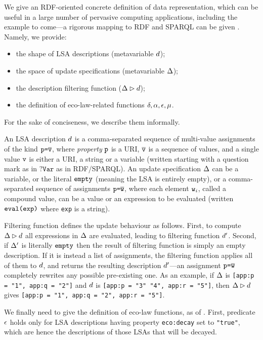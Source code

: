 \documentclass[12pt,a4paper,twoside,openright]{book}
\begin{document}
We give an RDF-oriented concrete definition of data representation, which can be useful in a large number of pervasive computing applications, including the example to come---a rigorous mapping to RDF and SPARQL can be given \cite{SemanticSapereIGI2012}.
%
Namely, we provide:
\begin{itemize}
 \item the shape of LSA descriptions (metavariable $d$);
 \item the space of update specifications (metavariable $\Delta$);
 \item the description filtering function ($\Delta\rhd d$);
 \item the definition of eco-law-related functions $\delta,\alpha,\epsilon,\mu$.
\end{itemize}
For the sake of conciseness, we describe them informally.

An LSA description $d$ is a comma-separated sequence of multi-value assignments of the kind $\texttt{p} \texttt{=} \overline{\texttt{v}}$, where \emph{property} $\texttt{p}$ is a URI, $\overline{\texttt{v}}$ is a sequence of values, and a single value $\texttt{v}$ is either a URI, a string or a variable (written starting with a question mark as in $\texttt{?Var}$ as in RDF/SPARQL).
%
An update specification $\Delta$ can be a variable, or the literal $\texttt{empty}$ (meaning the LSA is entirely empty), or a comma-separated sequence of assignments $\texttt{p}\texttt{=} \overline{\texttt{w}}$, where each element $\texttt{w}_i$, called a compound value, can be a value or an expression to be evaluated (written $\texttt{eval(exp)}$ where \texttt{exp} is a string).

Filtering function defines the update behaviour as follows.
%
First, to compute $\Delta\rhd d$ all expressions in $\Delta$ are evaluated, leading to filtering function $d'$.
%
Second, if $\Delta'$ is literally $\texttt{empty}{}$ then the result of filtering function is simply an empty description.
%
If it is instead a list of assignments, the filtering function applies all of them to $d$, and returns the resulting description $d'$---an assignment $\texttt{p}\texttt{=} \overline{\texttt{w}}$ completely rewrites any possible pre-existing one.
%
As an example, if $\Delta$ is \mbox{\texttt{[app:p = "1", app:q = "2"]}} and $d$ is \mbox{\texttt{[app:p = "3" "4", app:r = "5"]}}, then $\Delta\rhd d$ gives \mbox{\texttt{[app:p = "1", app:q = "2", app:r = "5"]}}.

We finally need to give the definition of eco-law functions, as of .
%
First, predicate $\epsilon$ holds only for LSA descriptions having property \texttt{eco:decay} set to \texttt{"true"}, which are hence the descriptions of those LSAs that will be decayed.
\end{document}

